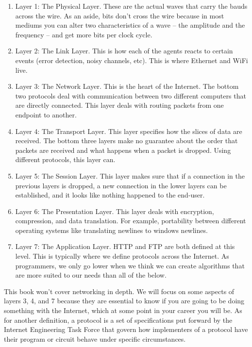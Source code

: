 \begin{enumerate}
\item Layer 1: The Physical Layer.
  These are the actual waves that carry the bauds across the wire.
  As an aside, bits don't cross the wire because in most mediums you can alter two characteristics of a wave -- the amplitude and the frequency -- and get more bits per clock cycle.

\item Layer 2: The Link Layer.
  This is how each of the agents reacts to certain events (error detection, noisy channels, etc).
  This is where Ethernet and WiFi live.

\item Layer 3: The Network Layer.
  This is the heart of the Internet.
  The bottom two protocols deal with communication between two different computers that are directly connected.
  This layer deals with routing packets from one endpoint to another.

\item Layer 4: The Transport Layer.
  This layer specifies how the slices of data are received.
  The bottom three layers make no guarantee about the order that packets are received and what happens when a packet is dropped.
  Using different protocols, this layer can.

\item Layer 5: The Session Layer.
  This layer makes sure that if a connection in the previous layers is dropped, a new connection in the lower layers can be established, and it looks like nothing happened to the end-user.

\item Layer 6: The Presentation Layer.
  This layer deals with encryption, compression, and data translation.
  For example, portability between different operating systems like translating newlines to windows newlines.

\item Layer 7: The Application Layer.
  HTTP and FTP are both defined at this level.
  This is typically where we define protocols across the Internet.
  As programmers, we only go lower when we think we can create algorithms that are more suited to our needs than all of the below.

\end{enumerate}

This book won't cover networking in depth.
We will focus on some aspects of layers 3, 4, and 7 because they are essential to know if you are going to be doing something with the Internet, which at some point in your career you will be.
As for another definition, a protocol is a set of specifications put forward by the Internet Engineering Task Force that govern how implementers of a protocol have their program or circuit behave under specific circumstances.

